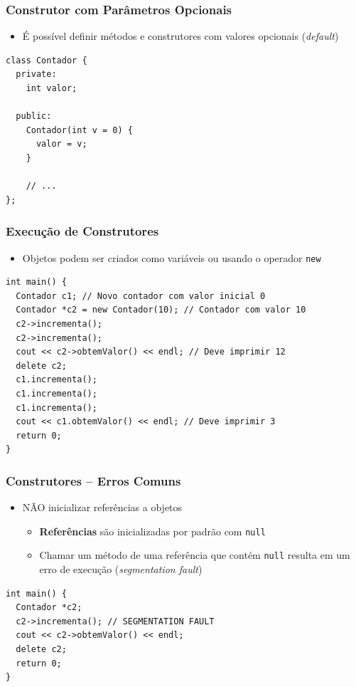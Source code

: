 \documentclass[aspectratio=169]{beamer}
\begin{document}
\begin{frame}[fragile]\frametitle{Construtor com Parâmetros Opcionais}
\begin{itemize}
	\item É possível definir métodos e construtores com valores opcionais (\emph{default})
\end{itemize}
\begin{lstlisting}
class Contador {
  private:
    int valor;

  public:
    Contador(int v = 0) {
      valor = v;
    }

    // ...
};
\end{lstlisting}
\end{frame}

\begin{frame}[fragile]\frametitle{Execução de Construtores}
\begin{itemize}
	\item Objetos podem ser criados como variáveis ou usando o operador \texttt{new}
\end{itemize}
\begin{lstlisting}
int main() {
  Contador c1; // Novo contador com valor inicial 0
  Contador *c2 = new Contador(10); // Contador com valor 10
  c2->incrementa();
  c2->incrementa();
  cout << c2->obtemValor() << endl; // Deve imprimir 12
  delete c2;
  c1.incrementa();
  c1.incrementa();
  c1.incrementa();
  cout << c1.obtemValor() << endl; // Deve imprimir 3
  return 0;
}
\end{lstlisting}
\end{frame}

\begin{frame}[fragile]\frametitle{Construtores -- Erros Comuns}
\begin{itemize}
	\item NÃO inicializar referências a objetos
	\begin{itemize}
		\item \textbf{Referências} são inicializadas por padrão com \texttt{null}
		\item Chamar um método de uma referência que contém \texttt{null} resulta em um erro de execução (\emph{segmentation fault})
	\end{itemize}
\end{itemize}
\begin{lstlisting}
int main() {
  Contador *c2;
  c2->incrementa(); // SEGMENTATION FAULT
  cout << c2->obtemValor() << endl;
  delete c2;
  return 0;
}
\end{lstlisting}
\end{frame}
\end{document}
